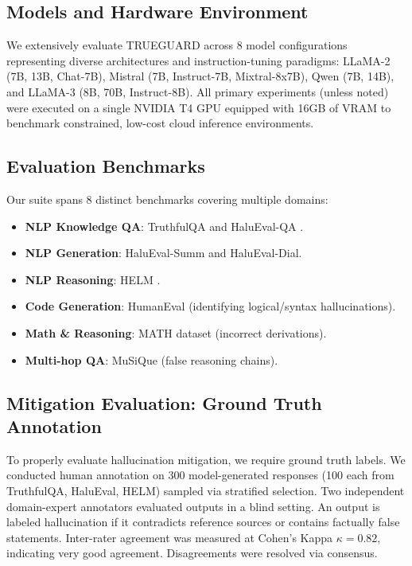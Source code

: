 \documentclass[conference]{IEEEtran}
\begin{document}
\subsection{Models and Hardware Environment}
We extensively evaluate TRUEGUARD across 8 model configurations representing diverse architectures and instruction-tuning paradigms: LLaMA-2 (7B, 13B, Chat-7B), Mistral (7B, Instruct-7B, Mixtral-8x7B), Qwen (7B, 14B), and LLaMA-3 (8B, 70B, Instruct-8B). All primary experiments (unless noted) were executed on a single NVIDIA T4 GPU equipped with 16GB of VRAM to benchmark constrained, low-cost cloud inference environments.

\subsection{Evaluation Benchmarks}
Our suite spans 8 distinct benchmarks covering multiple domains:
\begin{itemize}
    \item \textbf{NLP Knowledge QA}: TruthfulQA \cite{bang2023multitask} and HaluEval-QA \cite{li2023halueval}.
    \item \textbf{NLP Generation}: HaluEval-Summ and HaluEval-Dial.
    \item \textbf{NLP Reasoning}: HELM \cite{liang2022holistic}.
    \item \textbf{Code Generation}: HumanEval (identifying logical/syntax hallucinations).
    \item \textbf{Math \& Reasoning}: MATH dataset (incorrect derivations).
    \item \textbf{Multi-hop QA}: MuSiQue (false reasoning chains).
\end{itemize}

\subsection{Mitigation Evaluation: Ground Truth Annotation}
To properly evaluate hallucination mitigation, we require ground truth labels. We conducted human annotation on 300 model-generated responses (100 each from TruthfulQA, HaluEval, HELM) sampled via stratified selection. Two independent domain-expert annotators evaluated outputs in a blind setting. An output is labeled hallucination if it contradicts reference sources or contains factually false statements. Inter-rater agreement was measured at Cohen's Kappa $\kappa = 0.82$, indicating very good agreement. Disagreements were resolved via consensus.
\end{document}
